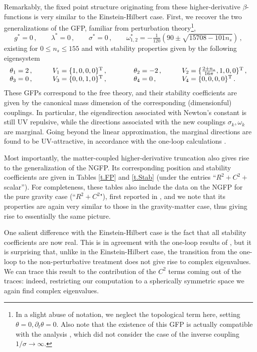 \documentclass[preprint,preprintnumbers,amsmath,amssymb,nofootinbib,APS]{revtex4}
\newcommand{\be}{\begin{equation}}
\newcommand{\ee}{\end{equation}}
\newcommand{\2}{\sqrt{2\,}}
\newcommand{\p}{\partial}
\begin{document}
Remarkably, the fixed point structure originating from these higher-derivative $\beta$-functions is very similar to the Einstein-Hilbert case. First, we recover the two generalizations of the GFP, familiar from perturbation
theory\footnote{In a slight abuse of notation, we neglect the topological term here, setting $\theta = 0, \p_t \theta= 0$. Also note that the existence of this GFP is actually compatible with the analysis \cite{Lauscher:2002mb}, which did not consider the case of the inverse coupling $1/\sigma \rightarrow \infty$.},
%
\be
g^* = 0  \, , \qquad \lambda^* = 0 \, , \qquad \sigma^* = 0 \, , \qquad 
\omega^*_{1,2} = - \tfrac{1}{120} \left(90 \pm \sqrt{15708 - 101 n_s} \right) \, ,
\ee
%
existing for $0 \le n_s \le 155$ and with
stability properties given by the following eigensystem
%
\be
\begin{array}{llll}
\theta_1 = 2 \, , \qquad & V_1 =  \{ 1,0,0,0 \}^{\rm T} \, , \qquad \quad &
\theta_2 = -2 \, , \qquad & V_2 =  \{ \frac{2+n_s}{16 \pi},1,0,0 \}^{\rm T} \, , \\
\theta_3 = 0 \, , \qquad & V_3 =  \{ 0,0,1,0 \}^{\rm T} \, , \qquad \quad &
\theta_4 = 0 \, , \qquad & V_4 = \{ 0,0,0,0 \}^{\rm T} \, . 
\end{array}
\ee
%
These GFPs correspond to the free theory,  and their stability coefficients are given by the canonical mass dimension of the corresponding (dimensionful) couplings. In particular, the eigendirection associated with Newton's constant is still UV repulsive, while the directions associated with the new couplings $\sigma_k, \omega_k$ are marginal. Going beyond the linear approximation, the
marginal directions are found to be UV-attractive, in accordance with the one-loop calculations
\cite{Codello:2006in}.

Most importantly, the matter-coupled higher-derivative truncation also gives rise to the generalization of the NGFP. Its corresponding position and stability coefficients are given in Tables \ref{t.FP} and \ref{t.Stab} (under the entries ``$R^2+C^2+$scalar''). 
%
For completeness, these tables also include the data on the NGFP for the pure gravity case (``$R^2+C^2$"), first reported in \cite{us1}, and we note that its properties are again very similar to those in the gravity-matter case, thus giving rise to essentially the same picture. 

One salient difference with the Einstein-Hilbert case is the fact that all stability coefficients are now real. This is in agreement with the one-loop results of \cite{Codello:2006in}, but it is surprising that, unlike in the Einstein-Hilbert case, the transition from the one-loop to the non-perturbative treatment does not give rise to complex eigenvalues. We can trace this result to the contribution of the $C^2$ terms coming out of the traces: indeed, restricting our computation to a spherically symmetric space we again find complex eigenvalues.
%
\end{document}
